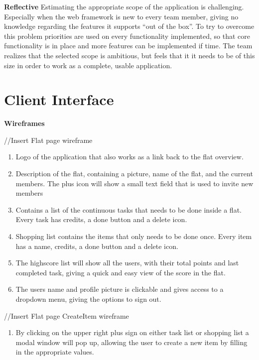 \documentclass{sig-alt-release2}
\begin{document}
\textbf{Reflective}
Estimating the appropriate scope of the application is challenging. Especially when the web framework is new to every team member, giving no knowledge regarding the features it supports {“}out of the box{”}. To try to overcome this problem priorities are used on every functionality implemented, so that core functionality is in place and more features can be implemented if time. The team realizes that the selected scope is ambitious, but feels that it it needs to be of this size in order to work as a complete, usable application.

\section{Client Interface}

\textbf{Wireframes}

//Insert Flat page wireframe
\begin{enumerate}
\item Logo of the application that also works as a link back to the flat overview. 
\item Description of the flat, containing a picture, name of the flat, and the current members. The plus icon will show a small text field that is used to invite new members
\item Contains a list of the continuous tasks that needs to be done inside a flat. Every task has credits, a done button and a delete icon. 
\item Shopping list contains the items that only needs to be done once. Every item has a name, credits, a done button and a delete icon. 
\item The highscore list will show all the users, with their total points and last completed task, giving a quick and easy view of the score in the flat. 
\item The users name and profile picture is clickable and gives access to a dropdown menu, giving the options to sign out. 
\end{enumerate}
	
//Insert Flat page CreateItem wireframe
\begin{enumerate}
\item By clicking on the upper right plus sign on either task list or shopping list a modal window will pop up, allowing the user to create a new item by filling in the appropriate values.
\end{enumerate}
\end{document}
